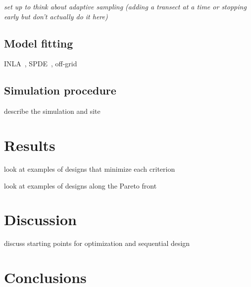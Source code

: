 \documentclass[review]{elsarticle}
\begin{document}
{\it set up to think about adaptive sampling (adding a transect at a time or
stopping early but don't actually do it here)}


\subsection{Model fitting}

INLA~\citep{rueetal}, SPDE~\citep{lindgrenetal}, off-grid~\citep{simpsonetal}


\subsection{Simulation procedure}

describe the simulation and site




\section{Results}

look at examples of designs that minimize each criterion

look at examples of designs along the Pareto front


\section{Discussion}

discuss starting points for optimization and sequential design


\section{Conclusions}
\end{document}
